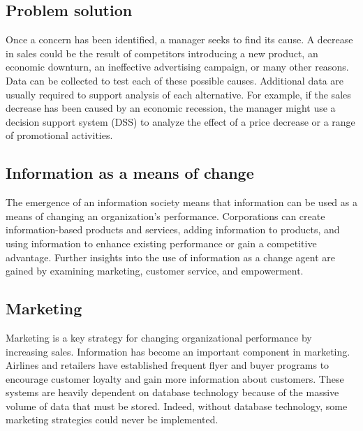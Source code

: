 \documentclass[
]{article}
\begin{document}
\hypertarget{problem-solution}{%
\subsection*{Problem solution}\label{problem-solution}}

Once a concern has been identified, a manager seeks to find its cause. A
decrease in sales could be the result of competitors introducing a new
product, an economic downturn, an ineffective advertising campaign, or
many other reasons. Data can be collected to test each of these possible
causes. Additional data are usually required to support analysis of each
alternative. For example, if the sales decrease has been caused by an
economic recession, the manager might use a decision support system
(DSS) to analyze the effect of a price decrease or a range of
promotional activities.

\hypertarget{information-as-a-means-of-change}{%
\subsection*{Information as a means of change}\label{information-as-a-means-of-change}}

The emergence of an information society means that information can be
used as a means of changing an organization's performance. Corporations
can create information-based products and services, adding information
to products, and using information to enhance existing performance or
gain a competitive advantage. Further insights into the use of
information as a change agent are gained by examining marketing,
customer service, and empowerment.

\hypertarget{marketing}{%
\subsection*{Marketing}\label{marketing}}

Marketing is a key strategy for changing organizational performance by
increasing sales. Information has become an important component in
marketing. Airlines and retailers have established frequent flyer and
buyer programs to encourage customer loyalty and gain more information
about customers. These systems are heavily dependent on database
technology because of the massive volume of data that must be stored.
Indeed, without database technology, some marketing strategies could
never be implemented.
\end{document}
